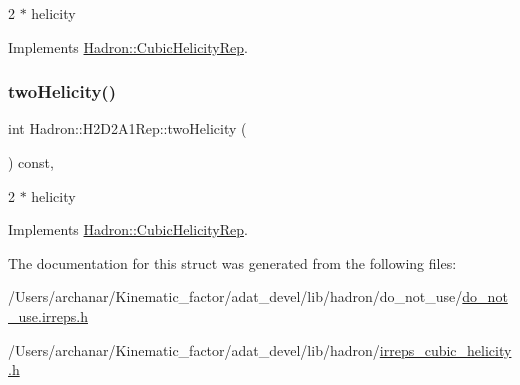 2 $\ast$ helicity 

Implements \mbox{\hyperlink{structHadron_1_1CubicHelicityRep_af507aa56fc2747eacc8cb6c96db31ecc}{Hadron\+::\+Cubic\+Helicity\+Rep}}.

\mbox{\label{structHadron_1_1H2D2A1Rep_a9e33338f0582361895bc7b7853741335}} 
\subsubsection{\texorpdfstring{twoHelicity()}{twoHelicity()}\hspace{0.1cm}{\footnotesize\ttfamily [2/2]}}
{\footnotesize\ttfamily int Hadron\+::\+H2\+D2\+A1\+Rep\+::two\+Helicity (\begin{DoxyParamCaption}{ }\end{DoxyParamCaption}) const\hspace{0.3cm}{\ttfamily [inline]}, {\ttfamily [virtual]}}

2 $\ast$ helicity 

Implements \mbox{\hyperlink{structHadron_1_1CubicHelicityRep_af507aa56fc2747eacc8cb6c96db31ecc}{Hadron\+::\+Cubic\+Helicity\+Rep}}.



The documentation for this struct was generated from the following files\+:\begin{DoxyCompactItemize}
\item 
/\+Users/archanar/\+Kinematic\+\_\+factor/adat\+\_\+devel/lib/hadron/do\+\_\+not\+\_\+use/\mbox{\hyperlink{do__not__use_8irreps_8h}{do\+\_\+not\+\_\+use.\+irreps.\+h}}\item 
/\+Users/archanar/\+Kinematic\+\_\+factor/adat\+\_\+devel/lib/hadron/\mbox{\hyperlink{lib_2hadron_2irreps__cubic__helicity_8h}{irreps\+\_\+cubic\+\_\+helicity.\+h}}\end{DoxyCompactItemize}

